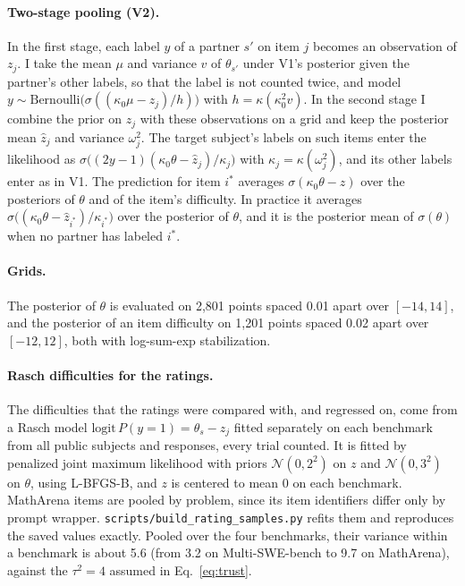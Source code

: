 \paragraph{Two-stage pooling (V2).}
In the first stage, each label $y$ of a partner $s'$ on item $j$ becomes an observation of $z_j$. I take the mean $\mu$ and variance $v$ of $\theta_{s'}$ under V1's posterior given the partner's other labels, so that the label is not counted twice, and model $y \sim \mathrm{Bernoulli}\bigl(\sigma((\kappa_0\mu - z_j)/h)\bigr)$ with $h = \kappa(\kappa_0^2 v)$. In the second stage I combine the prior on $z_j$ with these observations on a grid and keep the posterior mean $\hat z_j$ and variance $\omega_j^2$. The target subject's labels on such items enter the likelihood as $\sigma\bigl((2y-1)(\kappa_0\theta - \hat z_j)/\kappa_j\bigr)$ with $\kappa_j = \kappa(\omega_j^2)$, and its other labels enter as in V1. The prediction for item $i^*$ averages $\sigma(\kappa_0\theta - z)$ over the posteriors of $\theta$ and of the item's difficulty. In practice it averages $\sigma\bigl((\kappa_0\theta - \hat z_{i^*})/\kappa_{i^*}\bigr)$ over the posterior of $\theta$, and it is the posterior mean of $\sigma(\theta)$ when no partner has labeled $i^*$.

\paragraph{Grids.}
The posterior of $\theta$ is evaluated on 2,801 points spaced 0.01 apart over $[-14, 14]$, and the posterior of an item difficulty on 1,201 points spaced 0.02 apart over $[-12, 12]$, both with log-sum-exp stabilization.

\paragraph{Rasch difficulties for the ratings.}
The difficulties that the ratings were compared with, and regressed on, come from a Rasch model $\mathrm{logit}\,P(y = 1) = \theta_s - z_j$ fitted separately on each benchmark from all public subjects and responses, every trial counted. It is fitted by penalized joint maximum likelihood with priors $\mathcal{N}(0, 2^2)$ on $z$ and $\mathcal{N}(0, 3^2)$ on $\theta$, using L-BFGS-B, and $z$ is centered to mean 0 on each benchmark. MathArena items are pooled by problem, since its item identifiers differ only by prompt wrapper. \texttt{scripts/build\_rating\_samples.py} refits them and reproduces the saved values exactly. Pooled over the four benchmarks, their variance within a benchmark is about 5.6 (from 3.2 on Multi-SWE-bench to 9.7 on MathArena), against the $\tau^2 = 4$ assumed in Eq.~\eqref{eq:trust}.

